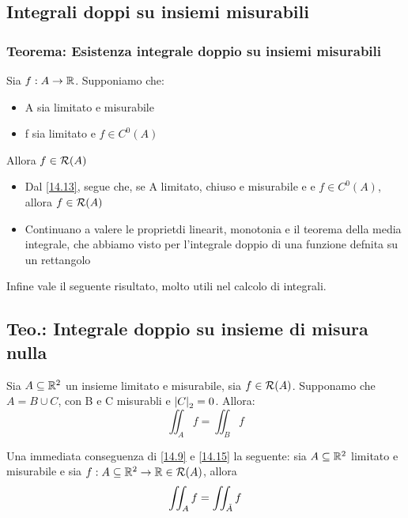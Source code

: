 \subsection{Integrali doppi su insiemi misurabili}
\subsubsection{Teorema: Esistenza integrale doppio su insiemi misurabili}
\begin{theorem}
  \label{14.13}
  Sia $f : A \to \mathbb{R}$. Supponiamo che:
  \begin{itemize}
    \item A sia limitato e misurabile
    \item f sia limitato e $f \in C^0 (A)$
  \end{itemize}
  Allora $f\in \mathcal{R}(A)$
\end{theorem}
\begin{osservazione}
  \begin{itemize}
    \item Dal \ref{14.13}, segue che, se A \ace limitato, chiuso e misurabile e 
          e $f \in C^{0}(A)$, allora $f\in \mathcal{R}(A)$
    \item Continuano a valere le propriet\aca di linearit\aca, monotonia e il teorema della media integrale, che abbiamo
          visto per l'integrale doppio di una funzione defnita su un rettangolo
  \end{itemize}
\end{osservazione}
Infine vale il seguente risultato, molto utili nel calcolo di integrali.
\subsection{Teo.: Integrale doppio su insieme di misura nulla}
\begin{theorem}
  \label{14.15}
  Sia $A \subseteq \mathbb{R}^2$ un insieme limitato e misurabile, sia $f \in \mathcal{R}(A)$. 
  Supponamo che $A = B \cup C$, con B e C misurabli e $\left\lvert C \right\rvert_2 = 0$. Allora:
  $$\iint_{A} f = \iint_{B} f$$
\end{theorem}
\begin{osservazione}
  Una immediata conseguenza di \ref{14.9} e \ref{14.15} \ace la seguente: sia 
  $A \subseteq \mathbb{R}^2$ limitato e misurabile e sia $f: A \subseteq \mathbb{R}^2 \to \mathbb{R} \in \mathcal{R}(A)$, allora
  $$\iint_{A} f = \iint_{\mathring{A}} f$$
\end{osservazione}
